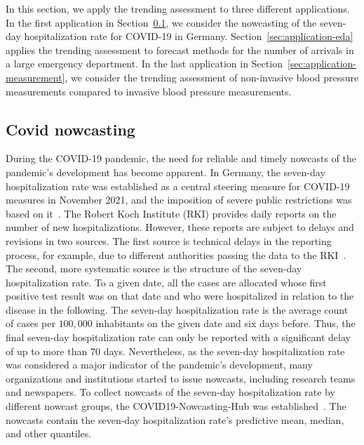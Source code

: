 In this section, we apply the trending assessment to three different applications.
In the first application in Section~\ref{sec:application-covid}, we consider the nowcasting of the seven-day hospitalization rate for COVID-19 in Germany.
Section~\ref{sec:application-eda} applies the trending assessment to forecast methods for the number of arrivals in a large emergency department.
In the last application in Section~\ref{sec:application-measurement}, we consider the trending assessment of non-invasive blood pressure measurements compared to invasive blood pressure measurements.

\subsection{Covid nowcasting} \label{sec:application-covid}

During the COVID-19 pandemic, the need for reliable and timely nowcasts of the pandemic's development has become apparent.
In Germany, the seven-day hospitalization rate was established as a central steering measure for COVID-19 measures in November 2021, and the imposition of severe public restrictions was based on it~\parencite{RobertKochInstitute2021}.
The Robert Koch Institute (RKI) provides daily reports on the number of new hospitalizations.
However, these reports are subject to delays and revisions in two sources.
The first source is technical delays in the reporting process, for example, due to different authorities passing the data to the RKI~\parencite{RobertKochInstitute2024}.
The second, more systematic source is the structure of the seven-day hospitalization rate.
To a given date, all the cases are allocated whose first positive test result was on that date and who were hospitalized in relation to the disease in the following.
The seven-day hospitalization rate is the average count of cases per $100,000$ inhabitants on the given date and six days before.
Thus, the final seven-day hospitalization rate can only be reported with a significant delay of up to more than 70 days.
Nevertheless, as the seven-day hospitalization rate was considered a major indicator of the pandemic's development, many organizations and institutions started to issue nowcasts, including research teams and newspapers.
To collect nowcasts of the seven-day hospitalization rate by different nowcast groups, the COVID19-Nowcasting-Hub was established~\parencite{ChairOfEconometricsAndStatisticsAtKarlsruheInstituteOfTechnology2024}.
The nowcasts contain the seven-day hospitalization rate's predictive mean, median, and other quantiles.

